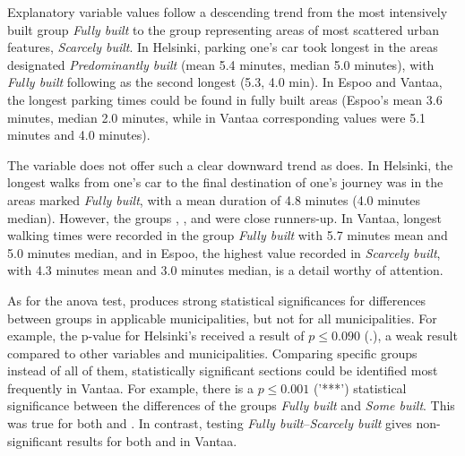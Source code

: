 Explanatory variable  values follow a descending trend from the most intensively built group \textit{Fully built} to the group representing areas of most scattered urban features, \textit{Scarcely built}. In Helsinki, parking one's car took longest in the areas designated \textit{Predominantly built} (mean 5.4 minutes, median 5.0 minutes), with \textit{Fully built} following as the second longest (5.3, 4.0 min). In Espoo and Vantaa, the longest parking times could be found in fully built areas (Espoo's mean 3.6 minutes, median 2.0 minutes, while in Vantaa corresponding values were 5.1 minutes and 4.0 minutes).

The variable  does not offer such a clear downward trend as  does. In Helsinki, the longest walks from one's car to the final destination of one's journey was in the areas marked \textit{Fully built}, with a mean duration of 4.8 minutes (4.0 minutes median). However, the groups , , and  were close runners-up. In Vantaa, longest walking times were recorded in the group \textit{Fully built} with 5.7 minutes mean and 5.0 minutes median, and in Espoo, the highest value recorded in \textit{Scarcely built}, with 4.3 minutes mean and 3.0 minutes median, is a detail worthy of attention.

As for the \acrshort{anova} test,  produces strong statistical significances for differences between groups in applicable municipalities, but not for all municipalities. For example, the p-value for Helsinki's  received a result of $p \leq 0.090$ (.), a weak result compared to other variables and municipalities. Comparing specific groups instead of all of them, statistically significant sections could be identified most frequently in Vantaa. For example, there is a $p \leq 0.001$ ('***') statistical significance between the differences of the groups \textit{Fully built} and \textit{Some built}. This was true for both  and . In contrast, testing \textit{Fully built}--\textit{Scarcely built} gives non-significant results for both  and  in Vantaa.

